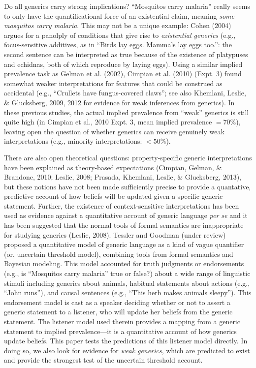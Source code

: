 \documentclass[floatsintext,doc]{apa6}
\theoremstyle{definition}
\theoremstyle{definition}
\theoremstyle{definition}
\theoremstyle{remark}
\begin{document}
Do all generics carry strong implications? \enquote{Mosquitos carry
malaria} really seems to only have the quantificational force of an
existential claim, meaning \emph{some mosquitos carry malaria}. This may
not be a unique example: Cohen (2004) argues for a panolply of
conditions that give rise to \emph{existential generics} (e.g.,
focus-sensitive additives, as in \enquote{Birds lay eggs. Mammals lay
eggs too.}: the second sentence can be interpreted as true because of
the existence of platypuses and echidnas, both of which reproduce by
laying eggs). Using a similar implied prevalence task as Gelman et al.
(2002), Cimpian et al. (2010) (Expt. 3) found somewhat weaker
interpretations for features that could be construed as accidental
(e.g., ``Crullets have fungus-covered claws''; see also Khemlani,
Leslie, \& Glucksberg, 2009, 2012 for evidence for weak inferences from
generics). In these previous studies, the actual implied prevalence from
\enquote{weak} generics is still quite high (in Cimpian et al., 2010
Expt. 3, mean implied prevalence \(= 70\%\)), leaving open the question
of whether generics can receive genuinely weak interpretations (e.g.,
minority interpretations: \(< 50\%\)).

There are also open theoretical questions: property-specific generic
interpretations have been explained as theory-based expectations
(Cimpian, Gelman, \& Brandone, 2010; Leslie, 2008; Prasada, Khemlani,
Leslie, \& Glucksberg, 2013), but these notions have not been made
sufficiently precise to provide a quantative, predictive account of how
beliefs will be updated given a specific generic statement. Further, the
existence of context-sensitive interpretations has been used as evidence
against a quantitative account of generic language \emph{per se} and it
has been suggested that the normal tools of formal semantics are
inappropriate for studying generics (Leslie, 2008).
Tessler and Goodman (under review) proposed a quantitative model of
generic language as a kind of vague quantifier (or, uncertain threshold
model), combining tools from formal semantics and Bayesian modeling.
This model accounted for truth judgments or endorsements (e.g., is
\enquote{Mosquitos carry malaria} true or false?) about a wide range of
linguistic stimuli including generics about animals, habitual statements
about actions (e.g., \enquote{John runs}), and causal sentences (e.g.,
\enquote{This herb makes animals sleepy}). This endorsement model is
cast as a speaker deciding whether or not to assert a generic statement
to a listener, who will update her beliefs from the generic statement.
The listener model used therein provides a mapping from a generic
statement to implied prevalence---it is a quantitative account of how
generics update beliefs. This paper tests the predictions of this
listener model directly. In doing so, we also look for evidence for
\emph{weak generics}, which are predicted to exist and provide the
strongest test of the uncertain threshold account.
\end{document}
